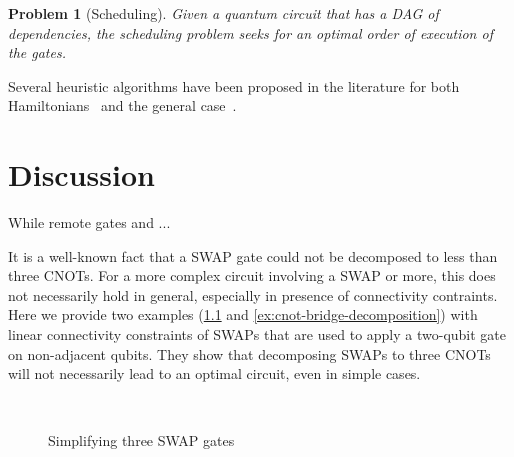 \documentclass{report}
\newtheorem{problem}{Problem}
\begin{document}
\begin{problem}[Scheduling]
  Given a quantum circuit that has a DAG of dependencies, the scheduling problem seeks for an optimal order of execution of the gates.
\end{problem}

Several heuristic algorithms have been proposed in the literature for both Hamiltonians~\cite{lao2021} and the general case~\cite{zhou2020, zulehner2018}.


\chapter{Discussion}\label{chap:discussion}

While remote gates and ...

It is a well-known fact that a SWAP gate could not be decomposed to less than three CNOTs. For a more complex circuit involving a SWAP or more, this does not necessarily hold in general, especially in presence of connectivity contraints. Here we provide two examples (\ref{ex:swap-swap-decomposition} and \ref{ex:cnot-bridge-decomposition}) with linear connectivity constraints of SWAPs that are used to apply a two-qubit gate on non-adjacent qubits.
They show that decomposing SWAPs to three CNOTs will not necessarily lead to an optimal circuit, even in simple cases.

\begin{figure}[ht]
  \centering
   \\

  \caption{Simplifying three SWAP gates}
  \label{ex:swap-swap-decomposition}
\end{figure}
\end{document}
